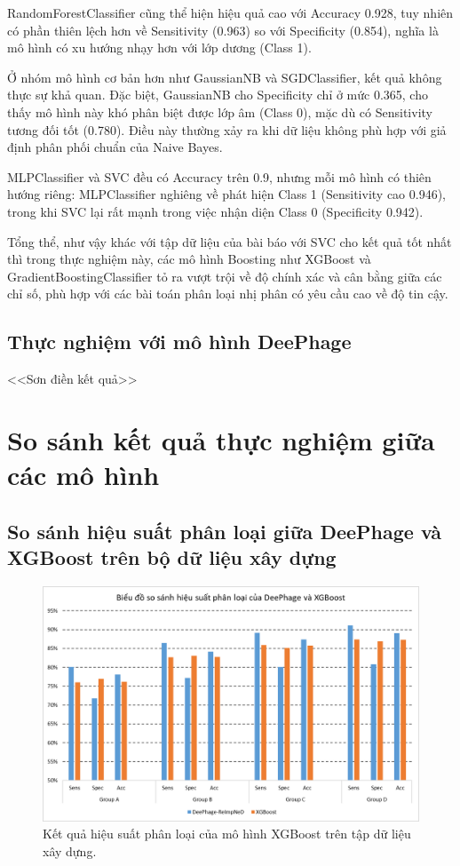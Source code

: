RandomForestClassifier cũng thể hiện hiệu quả cao với Accuracy 0.928, tuy nhiên có phần thiên lệch hơn về Sensitivity (0.963) so với Specificity (0.854), nghĩa là mô hình có xu hướng nhạy hơn với lớp dương (Class 1).

Ở nhóm mô hình cơ bản hơn như GaussianNB và SGDClassifier, kết quả không thực sự khả quan. Đặc biệt, GaussianNB cho Specificity chỉ ở mức 0.365, cho thấy mô hình này khó phân biệt được lớp âm (Class 0), mặc dù có Sensitivity tương đối tốt (0.780). Điều này thường xảy ra khi dữ liệu không phù hợp với giả định phân phối chuẩn của Naive Bayes.

MLPClassifier và SVC đều có Accuracy trên 0.9, nhưng mỗi mô hình có thiên hướng riêng: MLPClassifier nghiêng về phát hiện Class 1 (Sensitivity cao 0.946), trong khi SVC lại rất mạnh trong việc nhận diện Class 0 (Specificity 0.942).

Tổng thể, như vậy khác với tập dữ liệu của bài báo với SVC cho kết quả tốt nhất thì trong thực nghiệm này, các mô hình Boosting như XGBoost và GradientBoostingClassifier tỏ ra vượt trội về độ chính xác và cân bằng giữa các chỉ số, phù hợp với các bài toán phân loại nhị phân có yêu cầu cao về độ tin cậy. 


\subsection{Thực nghiệm với mô hình DeePhage}
<<Sơn điền kết quả>>

\section{So sánh kết quả thực nghiệm giữa các mô hình}


\subsection{So sánh hiệu suất phân loại giữa DeePhage và XGBoost trên bộ dữ liệu xây dựng}

\begin{figure}[H]
    \centering
    \includegraphics[width=1\linewidth]{figures/result_deephage_vs_xgboost.png}
    \caption{Kết quả hiệu suất phân loại của mô hình XGBoost trên tập dữ liệu xây dựng.}
    \label{fig:result_2}
\end{figure}

